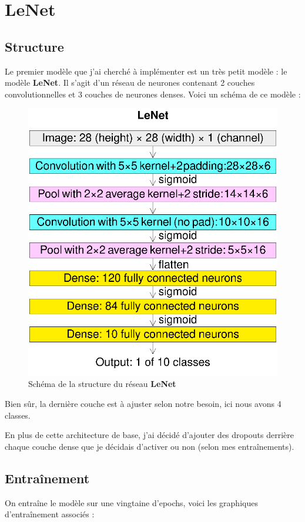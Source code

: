 \documentclass{report}
\begin{document}

\section{LeNet}

\subsection{Structure}

Le premier modèle que j'ai cherché à implémenter est un très petit modèle : le modèle 
\textbf{LeNet}. Il s'agit d'un réseau de neurones contenant 2 couches convolutionnelles et 
3 couches de neurones denses. Voici un schéma de ce modèle : 

\begin{figure}[H]
    \centering
    \includegraphics[width=200 pt]{Sources/Reseaux/LeNet_network.png}
    \caption{Schéma de la structure du réseau \textbf{LeNet}}
    \label{fig:schema_LeNet}
\end{figure}

Bien sûr, la dernière couche est à ajuster selon notre besoin, ici nous avons 4 classes.

\vspace{0.3cm}

En plus de cette architecture de base, j'ai décidé d'ajouter des dropouts derrière chaque couche dense que 
je décidais d'activer ou non (selon mes entraînements).

\newpage

\subsection{Entraînement}

On entraîne le modèle sur une vingtaine d'epochs, voici les graphiques d'entraînement associés :
\end{document}
